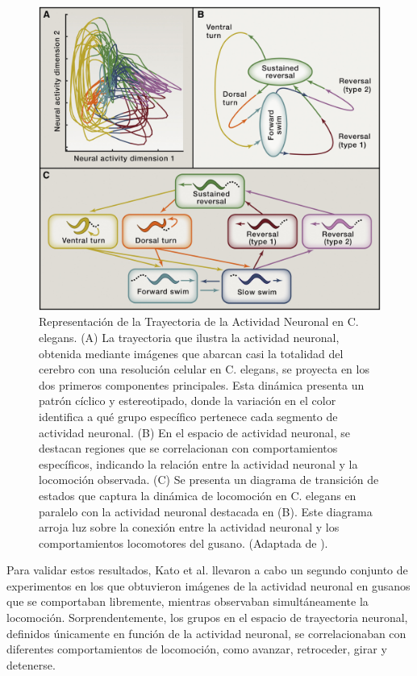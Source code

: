  \begin{figure}[h!]
	\centering\includegraphics[width=\imsize]{kato_2.jpg}
	\caption[Representación de la Trayectoria de la Actividad Neuronal en C. elegans.]{ Representación de la Trayectoria de la Actividad Neuronal en C. elegans. (A) La trayectoria que ilustra la actividad neuronal, obtenida mediante imágenes que abarcan casi la totalidad del cerebro con una resolución celular en C. elegans, se proyecta en los dos primeros componentes principales. Esta dinámica presenta un patrón cíclico y estereotipado, donde la variación en el color identifica a qué grupo específico pertenece cada segmento de actividad neuronal. (B) En el espacio de actividad neuronal, se destacan regiones que se correlacionan con comportamientos específicos, indicando la relación entre la actividad neuronal y la locomoción observada. (C) Se presenta un diagrama de transición de estados que captura la dinámica de locomoción en C. elegans en paralelo con la actividad neuronal destacada en (B). Este diagrama arroja luz sobre la conexión entre la actividad neuronal y los comportamientos locomotores del gusano. (Adaptada de \protect\cite{branson_imaging_2015}). }\label{fig:kato1}
\end{figure}


Para validar estos resultados, Kato et al. llevaron a cabo un segundo conjunto de experimentos en los que obtuvieron imágenes de la actividad neuronal en gusanos que se comportaban libremente, mientras observaban simultáneamente la locomoción. Sorprendentemente, los grupos en el espacio de trayectoria neuronal, definidos únicamente en función de la actividad neuronal, se correlacionaban con diferentes comportamientos de locomoción, como avanzar, retroceder, girar y detenerse.


